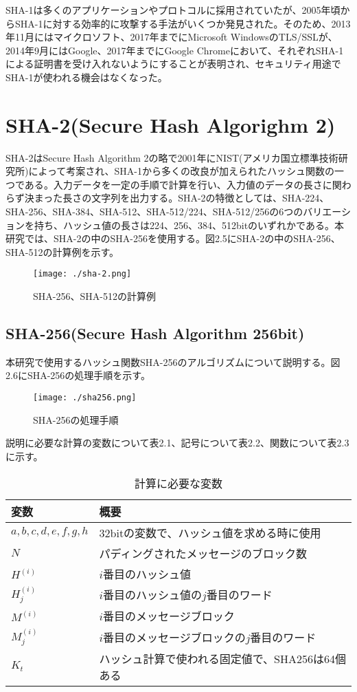 \documentclass{thesis}
\begin{document}
SHA-1は多くのアプリケーションやプロトコルに採用されていたが、2005年頃からSHA-1に対する効率的に攻撃する手法がいくつか発見された。そのため、2013年11月にはマイクロソフト、2017年までにMicrosoft WindowsのTLS/SSLが、2014年9月にはGoogle、2017年までにGoogle Chromeにおいて、それぞれSHA-1による証明書を受け入れないようにすることが表明され、セキュリティ用途でSHA-1が使われる機会はなくなった。

\section{SHA-2(Secure Hash Algorighm 2)}
SHA-2はSecure Hash Algorithm 2の略で2001年にNIST(アメリカ国立標準技術研究所)によって考案され、SHA-1から多くの改良が加えられたハッシュ関数の一つである\cite{four}。入力データを一定の手順で計算を行い、入力値のデータの長さに関わらず決まった長さの文字列を出力する。SHA-2の特徴としては、SHA-224、SHA-256、SHA-384、SHA-512、SHA-512/224、SHA-512/256の6つのバリエーションを持ち、ハッシュ値の長さは224、256、384、512bitのいずれかである。本研究では、SHA-2の中のSHA-256を使用する。図2.5にSHA-2の中のSHA-256、SHA-512の計算例を示す。

\begin{figure}[H]
 \center
 \texttt{[image: ./sha-2.png]}
 \caption{SHA-256、SHA-512の計算例}
\end{figure}

\subsection{SHA-256(Secure Hash Algorithm 256bit)}
本研究で使用するハッシュ関数SHA-256のアルゴリズムについて説明する\cite{five}。図2.6にSHA-256の処理手順を示す。

\begin{figure}[H]
 \center
 \texttt{[image: ./sha256.png]}
 \caption{SHA-256の処理手順\cite{six}}
\end{figure}

説明に必要な計算の変数について表2.1、記号について表2.2、関数について表2.3に示す。

\begin{table}[H]
\centering
\caption{計算に必要な変数}
\begin{tabular}{|l|l|} \hline
\textbf{変数} & \textbf{概要} \\ \hline
$a,b,c,d,e,f,g,h$ & 32bitの変数で、ハッシュ値を求める時に使用 \\ \hline
$N$ & パディングされたメッセージのブロック数 \\ \hline
$H^{(i)}$ & $i$番目のハッシュ値 \\ \hline
$H_{j}^{(i)}$ & $i$番目のハッシュ値の$j$番目のワード \\ \hline
$M^{(i)}$ & $i$番目のメッセージブロック \\ \hline
$M_{j}^{(i)}$ & $i$番目のメッセージブロックの$j$番目のワード \\ \hline
$K_t$ & ハッシュ計算で使われる固定値で、SHA256は64個ある \\ \hline
\end{tabular}
\end{table}
\end{document}
